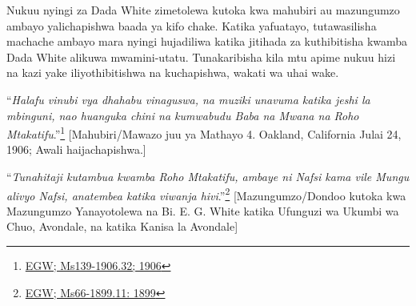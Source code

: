 Nukuu nyingi za Dada White zimetolewa kutoka kwa mahubiri au mazungumzo ambayo yalichapishwa baada ya kifo chake. Katika yafuatayo, tutawasilisha machache ambayo mara nyingi hujadiliwa katika jitihada za kuthibitisha kwamba Dada White alikuwa mwamini-utatu. Tunakaribisha kila mtu apime nukuu hizi na kazi yake iliyothibitishwa na kuchapishwa, wakati wa uhai wake.


“\textit{Halafu vinubi vya dhahabu vinaguswa, na muziki unavuma katika jeshi la mbinguni, nao huanguka chini na kumwabudu Baba na Mwana na Roho Mtakatifu}.”\footnote{\href{https://egwwritings.org/?ref=en_Ms139-1906.32&para=9579.38}{EGW; Ms139-1906.32; 1906}} [Mahubiri/Mawazo juu ya Mathayo 4. Oakland, California Julai 24, 1906; Awali haijachapishwa.]


“\textit{Tunahitaji kutambua kwamba Roho Mtakatifu, ambaye ni Nafsi kama vile Mungu alivyo Nafsi, anatembea katika viwanja hivi}.”\footnote{\href{https://egwwritings.org/?ref=en_Ms66-1899.11&para=6622.19}{EGW; Ms66-1899.11: 1899}} [Mazungumzo/Dondoo kutoka kwa Mazungumzo Yanayotolewa na Bi. E. G. White katika Ufunguzi wa Ukumbi wa Chuo, Avondale, na katika Kanisa la Avondale]
